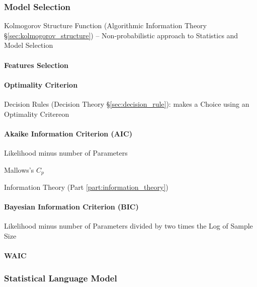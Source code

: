 \subsubsection{Model Selection}\label{sec:model_selection}

Kolmogorov Structure Function (Algorithmic Information Theory
\S\ref{sec:kolmogorov_structure}) -- Non-probabilistic approach to Statistics
and Model Selection



\paragraph{Features Selection}\label{sec:feature_selection}\hfill

\paragraph{Optimality Criterion}\label{sec:optimality_criterion}\hfill

\fist Decision Rules (Decision Theory \S\ref{sec:decision_rule}): makes a
Choice using an Optimality Critereon



\paragraph{Akaike Information Criterion (AIC)}\label{sec:aic}\hfill

Likelihood minus number of Parameters

Mallows's $C_p$

\fist Information Theory (Part \ref{part:information_theory})



\paragraph{Bayesian Information Criterion (BIC)}\label{sec:bic}\hfill

Likelihood minus number of Parameters divided by two times the Log of Sample
Size



\paragraph{WAIC}\label{sec:waic}\hfill



\subsubsection{Statistical Language Model}
\label{sec:statistical_language_model}

